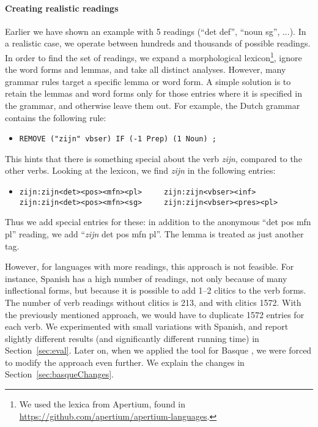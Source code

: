 {{\paragraph{Creating realistic readings}
\label{sec:realistic_readings}

Earlier we have shown an example with 5 readings (``det def'', ``noun
sg'', ...). In a realistic case, we operate between hundreds and
thousands of possible readings.  In order to find the set of readings,
we expand a morphological lexicon\footnote{We used the lexica from
 Apertium, found in \url{https://github.com/apertium/apertium-languages}.},
ignore the word forms and lemmas, and take all distinct analyses.
However, many grammar rules target a specific lemma or word form.  A
simple solution is to retain the lemmas and word forms only for those
entries where it is specified in the grammar, and otherwise leave them
out. For example, the Dutch grammar contains the following rule:

\begin{itemize}
 \item[] \texttt{REMOVE ("zijn" vbser) IF (-1 Prep) (1 Noun) ;}
\end{itemize}

\noindent This hints that there is something special about the verb
\emph{zijn}, compared to the other verbs. Looking at the lexicon, we
find \emph{zijn} in the following entries:

\begin{itemize}
 \item[]
\begin{verbatim}
zijn:zijn<det><pos><mfn><pl>     zijn:zijn<vbser><inf>
zijn:zijn<det><pos><mfn><sg>     zijn:zijn<vbser><pres><pl>
\end{verbatim}
\end{itemize}

\noindent Thus we add special entries for these: in addition to the anonymous
``det pos mfn pl'' reading, we add ``\emph{zijn} det pos mfn pl''.
The lemma is treated as just another tag.

However, for languages with more readings, this approach is not
feasible. For instance, Spanish has a high number of readings, not
only because of many inflectional forms, but because it is possible to
add 1--2 clitics to the verb forms.  The number of verb readings
without clitics is 213, and with clitics 1572.  With the previously
mentioned approach, we would have to duplicate 1572 entries for each
verb. We experimented with small variations with Spanish, and
report slightly different results (and significantly different running
time) in Section~\ref{sec:eval}. Later on, when we applied the tool for Basque
\cite{listenmaa2017basque}, we were forced to modify the approach even
further. We explain the changes in Section~\ref{sec:basqueChanges}.

}}
